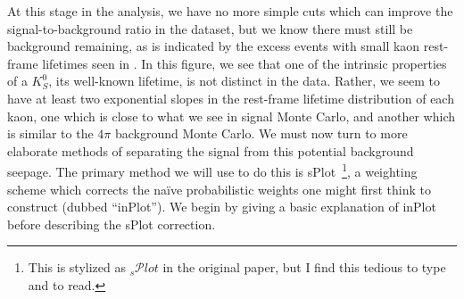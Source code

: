 At this stage in the analysis, we have no more simple cuts which can improve the signal-to-background ratio in the dataset, but we know there must still be background remaining, as is indicated by the excess events with small kaon rest-frame lifetimes seen in . In this figure, we see that one of the intrinsic properties of a $K_S^0$, its well-known lifetime, is not distinct in the data. Rather, we seem to have at least two exponential slopes in the rest-frame lifetime distribution of each kaon, one which is close to what we see in signal Monte Carlo, and another which is similar to the $4\pi$ background Monte Carlo. We must now turn to more elaborate methods of separating the signal from this potential background seepage. The primary method we will use to do this is sPlot~\cite{Pivk2005}\footnote{This is stylized as ${}_s\mathcal{P}lot$ in the original paper, but I find this tedious to type and to read.}, a weighting scheme which corrects the na\"ive probabilistic weights one might first think to construct (dubbed ``inPlot''). We begin by giving a basic explanation of inPlot before describing the sPlot correction.

